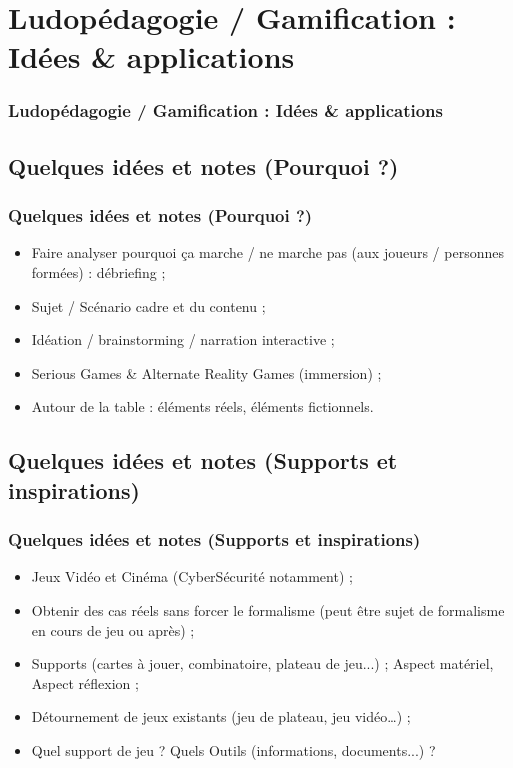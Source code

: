 \documentclass[slidetop,11pt]{beamer}
\begin{document}
\section{Ludop{\'e}dagogie / Gamification : Id{\'e}es \& applications}
\begin{frame}
	\frametitle{Ludop{\'e}dagogie / Gamification : Id{\'e}es \& applications}
	\tableofcontents[sections=2,currentsection,subsectionstyle=show/shaded/hide] %
\end{frame}

\subsection{Quelques id{\'e}es et notes (Pourquoi ?)}
\begin{frame}
	\frametitle{Quelques id{\'e}es et notes (Pourquoi ?)}
	\begin{itemize}
		\item Faire analyser pourquoi \c{c}a marche / ne marche pas (aux joueurs / personnes form{\'e}es) : d{\'e}briefing ; 
		\item Sujet / Sc{\'e}nario cadre et du contenu ; 
		\item Id{\'e}ation / brainstorming / narration interactive ; 
		\item Serious Games \& Alternate Reality Games (immersion) ; 
		\item Autour de la table : {\'e}l{\'e}ments r{\'e}els, {\'e}l{\'e}ments fictionnels. 
	\end{itemize}
\end{frame} 

\subsection{Quelques id{\'e}es et notes (Supports et inspirations)}
\begin{frame}
	\frametitle{Quelques id{\'e}es et notes (Supports et inspirations)}
	\begin{itemize}
		\item Jeux Vid{\'e}o et Cin{\'e}ma (CyberS{\'e}curit{\'e} notamment) ; 
		\item Obtenir des cas r{\'e}els sans forcer le formalisme (peut {\^e}tre sujet de formalisme en cours de jeu ou apr{\`e}s) ; 
		\item Supports (cartes {\`a} jouer, combinatoire, plateau de jeu...) ; Aspect mat{\'e}riel, Aspect r{\'e}flexion ; 
		\item D{\'e}tournement de jeux existants (jeu de plateau, jeu vid{\'e}o\ldots) ; 
		\item Quel support de jeu ? Quels Outils (informations, documents...) ?
	\end{itemize}
\end{frame} 
\end{document}
